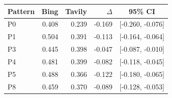 \begin{tabular}{lrrrc}
\toprule
Pattern & Bing & Tavily & $\Delta$ & 95\% CI\\
\midrule
P0 & 0.408 & 0.239 & -0.169 & [-0.260, -0.076] \\
P1 & 0.504 & 0.391 & -0.113 & [-0.164, -0.064] \\
P3 & 0.445 & 0.398 & -0.047 & [-0.087, -0.010] \\
P4 & 0.481 & 0.399 & -0.082 & [-0.118, -0.045] \\
P5 & 0.488 & 0.366 & -0.122 & [-0.180, -0.065] \\
P8 & 0.459 & 0.370 & -0.089 & [-0.128, -0.053] \\
\bottomrule
\end{tabular}